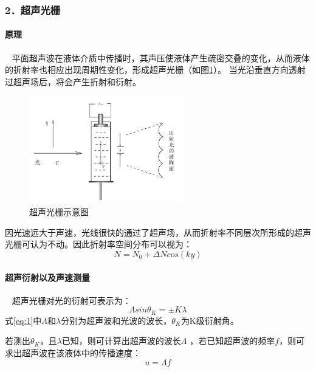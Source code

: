 \documentclass[12pt,a4paper,UTF8]{ctexart}
\begin{document}
\subsubsection*{2．超声光栅}
	\paragraph{原理}~
	\newline
	\indent
	平面超声波在液体介质中传播时，其声压使液体产生疏密交叠的变化，从而液体的折射率也相应出现周期性变化，形成超声光栅（如图\ref{fig:illus-3}）。
	当光沿垂直方向透射过超声场后，将会产生折射和衍射。
	\begin{figure}[htbp]
		\centering
		\includegraphics[width=0.6\textwidth]{attachments//illus-3.jpg}
		\caption{超声光栅示意图}
		\label{fig:illus-3}
	\end{figure}

	因光速远大于声速，光线很快的通过了超声场，从而折射率不同层次所形成的超声光栅可认为不动。因此折射率空间分布可以视为：
	\begin{equation}
	N=N_0+\varDelta N cos(ky)
	\end{equation}	

	\paragraph{超声衍射以及声速测量}~
	\newline
	\indent
	超声光栅对光的衍射可表示为：
	\begin{equation}\label{eq:1}
		\varLambda sin \theta_K = \pm K\lambda
	\end{equation}
	式\ref{eq:1}中$\varLambda $和$\lambda$分别为超声波和光波的波长，$\theta_K $为K级衍射角。

	若测出$\theta_K$，且$\lambda$已知，则可计算出超声波的波长$\varLambda$ ，若已知超声波的频率$f$，则可求出超声波在该液体中的传播速度：
	\begin{equation}\label{eq:2}
		u=\varLambda f
	\end{equation}
\end{document}
